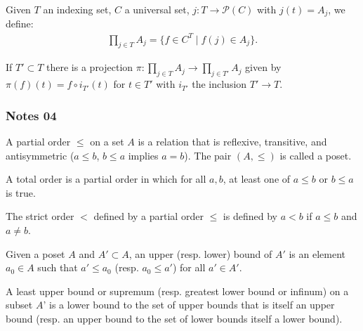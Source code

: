 \documentclass[12pt,letterpaper,reqno]{article}
\begin{document}
\begin{definition}\label{def:arb-product}
    Given $T$ an indexing set, $C$ a universal set, $j: T \to \mathcal{P}(C)$ with $j(t) = A_{j}$, we define:
    \begin{align*}
        \prod_{j \in T} A_{j} = \{ f \in C^{T} \mid f(j) \in A_{j} \}.
    \end{align*}
\end{definition}

\begin{definition}[Projection]\label{def:projection-map}
    If $T' \subset T$ there is a projection $\pi: \prod_{j \in T} A_{j} \to \prod_{j \in T'} A_{j}$ given by $\pi(f)(t) = f \circ i_{T'}(t)$ for $t \in T'$ with $i_{T'}$ the inclusion $T' \to T$.
\end{definition}

\subsubsection{Notes 04}

\begin{definition}\label{def:partial-order-poset}
    A partial order $\le$ on a set $A$ is a relation that is reflexive, transitive, and antisymmetric ($a \le b$, $b \le a$ implies $a=b$). The pair $(A, \le)$ is called a poset.
\end{definition}

\begin{definition}\label{def:total-order}
    A total order is a partial order in which for all $a, b$, at least one of $a \le b$ or $b \le a$ is true.
\end{definition}

\begin{definition}\label{def:strict-order}
    The strict order $<$ defined by a partial order $\le$ is defined by $a < b$ if $a \le b$ and $a \neq b$. 
\end{definition}

\begin{definition}\label{def:upper-lower-bound}
    Given a poset $A$ and $A' \subset A$, an upper (resp. lower) bound of $A'$ is an element $a_0 \in A$ such that $a' \le a_0$ (resp. $a_0 \le a'$) for all $a' \in A'$.
\end{definition}

\begin{definition}\label{def:sup-inf}
    A least upper bound or supremum (resp. greatest lower bound or infinum) on a subset $A$' is a lower bound to the set of upper bounds that is itself an upper bound (resp. an upper bound to the set of lower bounds itself a lower bound).
\end{definition}
\end{document}
